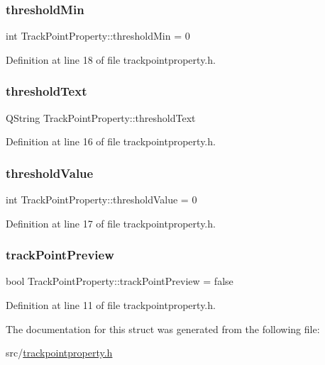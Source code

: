 \subsubsection{\texorpdfstring{thresholdMin}{thresholdMin}}
{\footnotesize\ttfamily int Track\+Point\+Property\+::threshold\+Min = 0}



Definition at line 18 of file trackpointproperty.\+h.

\mbox{\label{struct_track_point_property_a3e42b8fec411dd418b4174b76eafeecb}} 
\subsubsection{\texorpdfstring{thresholdText}{thresholdText}}
{\footnotesize\ttfamily Q\+String Track\+Point\+Property\+::threshold\+Text}



Definition at line 16 of file trackpointproperty.\+h.

\mbox{\label{struct_track_point_property_a85ba7ffd95773f8fa6bc557b6c08d40c}} 
\subsubsection{\texorpdfstring{thresholdValue}{thresholdValue}}
{\footnotesize\ttfamily int Track\+Point\+Property\+::threshold\+Value = 0}



Definition at line 17 of file trackpointproperty.\+h.

\mbox{\label{struct_track_point_property_a8153a5db4ba1ffc4aafa27507763cfde}} 
\subsubsection{\texorpdfstring{trackPointPreview}{trackPointPreview}}
{\footnotesize\ttfamily bool Track\+Point\+Property\+::track\+Point\+Preview = false}



Definition at line 11 of file trackpointproperty.\+h.



The documentation for this struct was generated from the following file\+:\begin{DoxyCompactItemize}
\item 
src/\mbox{\hyperlink{trackpointproperty_8h}{trackpointproperty.\+h}}\end{DoxyCompactItemize}
